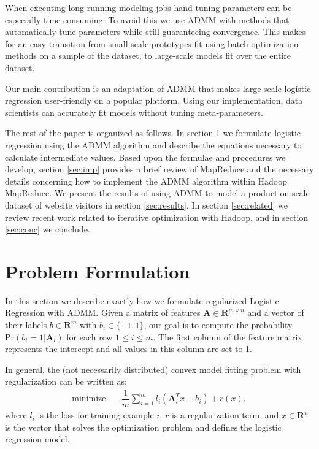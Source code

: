 \documentclass[10pt, conference, compsocconf]{IEEEtran}
\begin{document}
When executing long-running modeling jobs hand-tuning parameters can be especially time-consuming.  To avoid this we use ADMM with methods that automatically tune parameters while still guaranteeing convergence.  This makes for an easy transition from small-scale prototypes fit using batch optimization methods on a sample of the dataset, to large-scale models fit over the entire dataset.

Our main contribution is an adaptation of ADMM that makes large-scale logistic regression user-friendly on a popular platform.  Using our implementation, data scientists can accurately fit models without tuning meta-parameters.

The rest of the paper is organized as follows.  In section \ref{sec:prob} we formulate logistic regression using the ADMM algorithm and describe the equations necessary to calculate intermediate values.  Based upon the formulae and procedures we develop, section \ref{sec:imp} provides a brief review of MapReduce and the necessary details concerning how to implement the ADMM algorithm within Hadoop MapReduce.  We present the results of using ADMM to model a production scale dataset of website visitors in section \ref{sec:results}.  In section \ref{sec:related} we review recent work related to iterative optimization with Hadoop, and in section \ref{sec:conc} we conclude.

\section{Problem Formulation}\label{sec:prob}

In this section we describe exactly how we formulate regularized Logistic Regression with ADMM. Given a matrix of features $\mathbf{A}\in\mathbf{R}^{m\times n}$ and a vector of their labels $b\in\mathbf{R}^m$ with $b_i\in\{-1,1\}$, our goal is to compute the probability $\text{Pr}(b_i=1|\mathbf{A}_i)$ for each row $1\leq i\leq m$.  The first column of the feature matrix represents the intercept and all values in this column are set to 1.

In general, the (not necessarily distributed) convex model fitting problem with regularization can be written as:
\begin{align}
\text{minimize}&\quad \dfrac{1}{m}\sum_{i=1}^m l_i(\mathbf{A}_i^Tx - b_i) + r(x),\label{eq:primal}
\end{align}
where $l_i$ is the loss for training example $i$, $r$ is a regularization term, and $x\in\mathbf{R}^n$ is the vector that solves the optimization problem and defines the logistic regression model.
\end{document}

